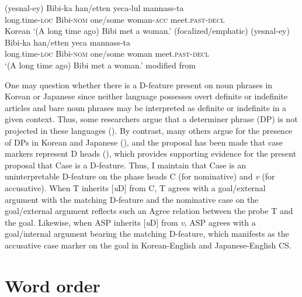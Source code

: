 \begin{exe}\ex \label{ex:151}
\begin{xlist}
    \ex \gll (yesnal-ey)   Bibi-ka    han/etten  yeca-lul        mannass-ta\\
    long.time-\textsc{loc} Bibi-\textsc{nom} one/some woman\textsc{{}-acc} meet.\textsc{past-decl}\\\hfill \hspace*{-5mm}Korean
    \glt ‘(A long time ago) Bibi met a woman.’     (focalized/emphatic)
    \ex \gll  (yesnal-ey)   Bibi-ka    han/etten  yeca   mannass-ta   \\
    long.time-\textsc{loc} Bibi-\textsc{nom} one/some woman meet.\textsc{past-decl} \\
    \glt ‘(A long time ago) Bibi met a woman.’  modified from \citet[58, (5)]{AhnCho2007}
\end{xlist}
\end{exe}

One may question whether there is a D-feature present on noun phrases in Korean or Japanese since neither language possesses overt definite or indefinite articles and bare noun phrases may be interpreted as definite or indefinite in a given context. Thus, some researchers argue that a determiner phrase (DP) is not projected in these languages (\citealt{Chierchia1988,Fukui1986,Tomioka2003}). By contrast, many others argue for the presence of DPs in Korean and Japanese (\citealt{Furuya2009,Kakegawa2003,Koike1999,ParkSY2008,Tateishi1987}), and the proposal has been made that case markers represent D heads (\citealt{Kakegawa2003,Koike1999,Tateishi1987}), which provides supporting evidence for the present proposal that Case is a D-feature. Thus, I maintain that Case is an uninterpretable D-feature on the phase heads C (for nominative) and \textit{v} (for accusative). When T inherits [\textit{u}D] from C, T agrees with a goal/external argument with the matching D-feature and the nominative case on the goal/external argument reflects such an Agree relation between the probe T and the goal. Likewise, when \ac{ASP} inherits [\textit{u}D] from \textit{v}, \ac{ASP} agrees with a goal/internal argument bearing the matching D-feature, which manifests as the accusative case marker on the goal in Korean-English and Japanese-English \ac{CS}. 

\section{Word order} \label{ch6:sect:WordOrder}

